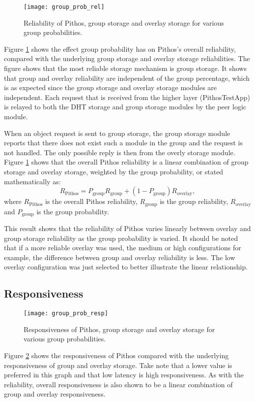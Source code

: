 \begin{figure}[htbp]
 \centering
 \texttt{[image: group\_prob\_rel]}
 \caption{Reliability of Pithos, group storage and overlay storage for various group probabilities.}
 \label{fig_group_prob_rel}
\end{figure}
%
Figure \ref{fig_group_prob_rel} shows the effect group probability has on Pithos's overall reliability, compared with the underlying group storage and overlay storage reliabilities. The figure shows that the most reliable storage mechanism is group storage. It shows that group and overlay reliability are independent of the group percentage, which is as expected since the group storage and overlay storage modules are independent. Each request that is received from the higher layer (PithosTestApp) is relayed to both the DHT storage and group storage modules by the peer logic module.

When an object request is sent to group storage, the group storage module reports that there does not exist such a module in the group and the request is not handled. The only possible reply is then from the overly storage module. Figure \ref{fig_group_prob_rel} shows that the overall Pithos reliability is a linear combination of group storage and overlay storage, weighted by the group probability, or stated mathematically as:
%
\begin{equation}
R_{\textrm{Pithos}} = P_{\textrm{group}}R_{\textrm{group}} + (1-P_{\textrm{group}})R_{\textrm{overlay}},
\end{equation}
%
where $R_{\textrm{Pithos}}$ is the overall Pithos reliability, $R_{\textrm{group}}$ is the group reliability, $R_{\textrm{overlay}}$ and $P_{\textrm{group}}$ is the group probability.

This result shows that the reliability of Pithos varies linearly between overlay and group storage reliability as the group probability is varied. It should be noted that if a more reliable overlay was used, the medium or high configurations for example, the difference between group and overlay reliability is less. The low overlay configuration was just selected to better illustrate the linear relationship.

\subsection{Responsiveness}

\begin{figure}[htbp]
 \centering
 \texttt{[image: group\_prob\_resp]}
 \caption{Responsiveness of Pithos, group storage and overlay storage for various group probabilities.}
 \label{fig_group_prob_resp}
\end{figure}
%
Figure \ref{fig_group_prob_resp} shows the responsiveness of Pithos compared with the underlying responsiveness of group and overlay storage. Take note that a lower value is preferred in this graph and that low latency is high responsiveness. As with the reliability, overall responsiveness is also shown to be a linear combination of group and overlay responsiveness.

